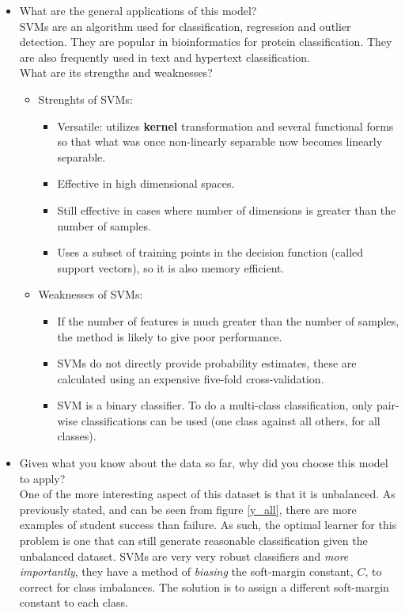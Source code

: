 \documentclass[twoside,openright,titlepage,numbers=noenddot,headinclude,%
               footinclude=true,cleardoublepage=empty,abstractoff,BCOR=5mm,%
               paper=a4,fontsize=11pt,ngerman,american]{scrreprt}
\numberwithin{theorem}{chapter}
\numberwithin{definition}{chapter}
\numberwithin{algorithm}{chapter}
\numberwithin{figure}{chapter}
\numberwithin{table}{chapter}
\numberwithin{equation}{chapter}
\begin{document}
\begin{itemize}
\item What are the general applications of this model?\\ 
SVMs are an algorithm used for classification, regression and outlier detection. They are popular in bioinformatics for protein classification. They are also frequently used in text and hypertext classification. \\
What are its strengths and weaknesses?
\begin{itemize}
       \item Strenghts of SVMs:
              \begin{itemize} 
                     \item Versatile: utilizes \textbf{kernel} transformation and several functional forms so that what was once non-linearly separable now becomes linearly separable.
                     \item Effective in high dimensional spaces.
                     \item Still effective in cases where number of dimensions is greater than the number of samples.
                     \item Uses a subset of training points in the decision function (called support vectors), so it is also memory efficient.
              \end{itemize}
       \item Weaknesses of SVMs:
              \begin{itemize} 
                     \item If the number of features is much greater than the number of samples, the method is likely to give poor performance.
                     \item SVMs do not directly provide probability estimates, these are calculated using an expensive five-fold cross-validation.
                     \item SVM is a binary classifier. To do a multi-class classification, only pair-wise classifications can be used (one class against all others, for all classes).
              \end{itemize}
       \end{itemize}

\item Given what you know about the data so far, why did you choose this model to apply?\\
One of the more interesting aspect of this dataset is that it is unbalanced. As previously stated, and can be seen from figure \ref{y_all}, there are more examples of student success than failure. As such, the optimal learner for this problem is one that can still generate reasonable classification given the unbalanced dataset. SVMs are very very robust classifiers and \textit{more importantly}, they have a method of \textit{biasing} the soft-margin constant, $C$, to correct for class imbalances. The solution is to assign a different soft-margin constant to each class.

\end{itemize}
\end{document}
